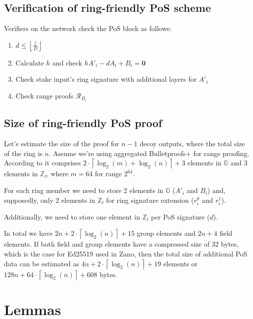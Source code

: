\documentclass{article}
\newcommand{\floor}[1]{\left\lfloor #1 \right\rfloor}
\newcommand{\ceil}[1]{\left\lceil #1 \right\rceil}
\numberwithin{figure}{section}
\begin{document}
\subsection{Verification of ring-friendly PoS scheme} \label{s_verification_ring_friendly}
Verifiers on the network check the PoS block as follows:

\begin{enumerate}
    \item $d \leq \floor{\frac{l}{D}}$
    
    \item Calculate $h$ and check $h A'_i - d A_i + B_i = \mathbf{0}$
    
    \item Check stake input's ring signature with additional layers for $A'_i$
    
    \item Check range proofs $\mathcal{R}_B_i$
\end{enumerate}


\subsection{Size of ring-friendly PoS proof}

Let's estimate the size of the proof for $n-1$ decoy outputs, where the total size of the ring is $n$. Assume we're using aggregated Bulletproofs+ for range proofing. According to \cite{BP+} it comprises $2 \cdot \ceil{\log_2(m) + \log_2(n)} + 3$ elements in $\mathbb{G}$ and 3 elements in $\mathbb{Z}_l$, where $m = 64$ for range $2^{64}$.

For each ring member we need to store 2 elements in $\mathbb{G}$ ($A'_i$ and $B_i$) and, supposedly, only 2 elements in $\mathbb{Z}_l$ for ring signature extension ($r^0_i$ and $r^1_i$).

Additionally, we need to store one element in $\mathbb{Z}_l$ per PoS signature ($d$).

In total we have $2n + 2 \cdot \ceil{\log_2(n)} + 15$ group elements and $2n + 4$ field elements. If both field and group elements have a compressed size of 32 bytes, which is the case for Ed25519 used in Zano, then the total size of additional PoS data can be estimated as $4n + 2 \cdot \ceil{\log_2(n)} + 19$ elements or $128n + 64 \cdot \ceil{\log_2(n)} + 608$ bytes.

%
%
\printbibliography


\newpage
\appendix
\section{Lemmas}
\end{document}
